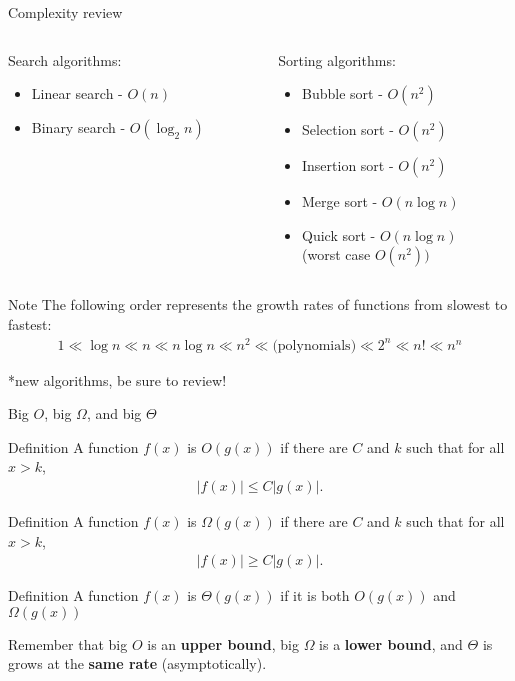 \documentclass[dvipsnames,t]{beamer}
\begin{document}
\begin{frame}{Complexity review}
\begin{columns}
\begin{column}{0.5\textwidth}
    Search algorithms:
    \begin{itemize}
    \item Linear search - $O(n)$
    \item Binary search - $O(\log_2{n})$
    \end{itemize}
\end{column}
\begin{column}{0.5\textwidth}  %
    Sorting algorithms:
    \begin{itemize}
    \item Bubble sort - $O(n^2)$
    \item Selection sort - $O(n^2)$
    \item Insertion sort - $O(n^2)$
    \item \alert{Merge sort - $O(n\log{n})$}
    \item \alert{Quick sort - $O(n\log{n})$ \\
    (worst case $O(n^2))$}
    \end{itemize}
\end{column}
\end{columns}

\begin{block}{Note}
The following order represents the growth rates of functions from slowest to fastest:
\begin{align*}
1 \ll \log{n} \ll n \ll n\log{n} \ll n^2 \ll \text{(polynomials)} \ll 2^n \ll n! \ll n^n
\end{align*}
\end{block}
\alert{*new algorithms, be sure to review!}
\end{frame}

\begin{frame}{Big $O$, big $\Omega$, and big $\Theta$}
\begin{block}{Definition}
	A function $f(x)$ is $O(g(x))$ if there are $C$ and $k$ such that for all $x>k$,
	\begin{align*}
	|f(x)| \leq C|g(x)|.
	\end{align*}
\end{block}
\begin{block}{Definition}
	A function $f(x)$ is $\Omega(g(x))$ if there are $C$ and $k$ such that for all $x>k$,
	\begin{align*}
	|f(x)| \geq C|g(x)|.
	\end{align*}
\end{block}
\begin{block}{Definition}
	A function $f(x)$ is $\Theta(g(x))$ if it is both $O(g(x))$ and $\Omega(g(x))$
\end{block}
Remember that big $O$ is an \textbf{upper bound}, big $\Omega$ is a \textbf{lower bound}, and $\Theta$ is grows at the \textbf{same rate} (asymptotically).
\end{frame}
\end{document}
